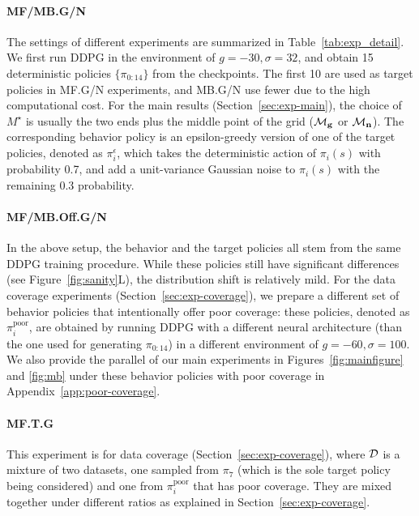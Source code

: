 \paragraph{MF/MB.G/N} The settings of different experiments are summarized in Table~\ref{tab:exp_detail}. We first run DDPG in the environment of $g=-30,\sigma=32$, and obtain 15 deterministic policies $\{\pi_{0:14}\}$ from the checkpoints. The first 10 are used as target policies in MF.G/N experiments, and MB.G/N use fewer due to the high computational cost. For the main results (Section~\ref{sec:exp-main}), the choice of $M^\star$ is usually the two ends plus the middle point of the grid ($\mathcal{M}_{\mathbf{g}}$ or $\mathcal{M}_{\mathbf{n}}$). The corresponding behavior policy is an epsilon-greedy version of one of the target policies, denoted as $\pi_i^\epsilon$, which takes the deterministic action of $\pi_i(s)$ with probability 0.7, and add a unit-variance Gaussian noise to $\pi_i(s)$ with the remaining 0.3 probability. 

\paragraph{MF/MB.Off.G/N} In the above setup, the behavior and the target policies all stem from the same DDPG training procedure. While these policies still have significant differences (see Figure~\ref{fig:sanity}L), the distribution shift is relatively mild. For the data coverage experiments (Section~\ref{sec:exp-coverage}), we prepare a different set of behavior policies that intentionally offer poor coverage: these policies, denoted as $\pi_i^{\textrm{poor}}$, are obtained by running DDPG with a different neural architecture (than the one used for generating $\pi_{0:14}$) in a different environment of $g=-60, \sigma=100$. We also provide the parallel of our main experiments in Figures~\ref{fig:mainfigure} and \ref{fig:mb} under these behavior policies with poor coverage in Appendix~\ref{app:poor-coverage}. 

\paragraph{MF.T.G} This experiment is for data coverage (Section~\ref{sec:exp-coverage}), where $\mathcal{D}$ is a mixture of two datasets, one sampled from $\pi_7$ (which is the sole target policy being considered) and one from $\pi_i^{\textrm{poor}}$ that has poor coverage. They are mixed together under different ratios as explained in Section~\ref{sec:exp-coverage}. 

